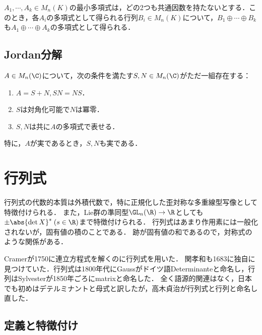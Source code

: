 \documentclass[uplatex, dvipdfmx]{jsreport}
\begin{document}
\begin{proposition}
    $A_1,\cdots,A_k\in M_n(K)$の最小多項式は，どの2つも共通因数を持たないとする．このとき，各$A_i$の多項式として得られる行列$B_i\in M_n(K)$について，$B_1\oplus\cdots\oplus B_k$も$A_1\oplus\cdots\oplus A_k$の多項式として得られる．
\end{proposition}

\subsection{Jordan分解}

\begin{theorem}
    $A\in M_n(\C)$について，次の条件を満たす$S,N\in M_n(\C)$がただ一組存在する：
    \begin{enumerate}
        \item $A=S+N,SN=NS$．
        \item $S$は対角化可能で$N$は冪零．
        \item $S,N$は共に$A$の多項式で表せる．
    \end{enumerate}
    特に，$A$が実であるとき，$S,N$も実である．
\end{theorem}

\section{行列式}

\begin{tcolorbox}[colframe=ForestGreen, colback=ForestGreen!10!white,breakable,colbacktitle=ForestGreen!40!white,coltitle=black,fonttitle=\bfseries\sffamily,
title=]
    行列式の代数的本質は外積代数で，特に正規化した歪対称な多重線型写像として特徴付けられる．
    また，Lie群の準同型$\GL_n(\R)\to\R$としても$\pm\abs{\det X}^s\;(s\in\R)$まで特徴付けられる．
    行列式はあまり作用素には一般化されないが，固有値の積のことである．
    跡が固有値の和であるので，対称式のような関係がある．
\end{tcolorbox}

\begin{history}
    Cramerが1750に連立方程式を解くのに行列式を用いた．
    関孝和も1683に独自に見つけていた．行列式は1800年代にGaussがドイツ語Determinanteと命名し，行列はSylvesterが1850年ごろにmatrixと命名した．
    全く語源的関連はなく，日本でも初めはデテルミナントと母式と訳したが，高木貞治が行列式と行列と命名し直した．
\end{history}

\subsection{定義と特徴付け}
\end{document}

